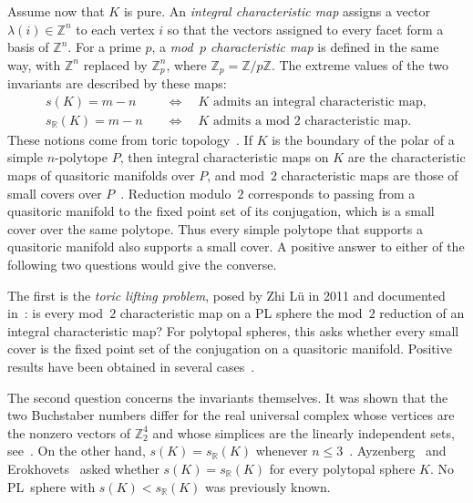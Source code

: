 \documentclass{amsart}
\theoremstyle{plain}
\numberwithin{equation}{section}
\theoremstyle{remark}
\theoremstyle{definition}
\newcommand{\Z}{\mathbb Z}
\newcommand{\R}{\mathbb R}
\begin{document}
Assume now that $K$ is pure.
An \emph{integral characteristic map} assigns a vector~$\lambda(i)\in\Z^n$ to each vertex $i$ so that the vectors assigned to every facet form a basis of $\Z^n$. 
For a prime $p$, a \emph{mod~$p$ characteristic map} is defined in the same way, with $\Z^n$ replaced by $\Z_p^n$, where $\Z_p=\Z/p\Z$.
The extreme values of the two invariants are described by these maps:
\begin{align*}
    s(K)=m-n &\quad\Longleftrightarrow\quad K\text{ admits an integral characteristic map},\\
    s_{\R}(K)=m-n &\quad\Longleftrightarrow\quad K\text{ admits a mod }2\text{ characteristic map}.  
\end{align*}
These notions come from toric topology~\cite{Davis-Januszkiewicz1991, Ishida-Fukukawa-Masuda2013, Buchstaber-Panov2015book}.
If $K$ is the boundary of the polar of a simple $n$-polytope $P$, then integral characteristic maps on $K$ are the characteristic maps of quasitoric manifolds over $P$, and mod~$2$ characteristic maps are those of small covers over $P$~\cite{Davis-Januszkiewicz1991}. 
Reduction modulo~$2$ corresponds to passing from a quasitoric manifold to the fixed point set of its conjugation, which is a small cover over the same polytope. 
Thus every simple polytope that supports a quasitoric manifold also supports a small cover. 
A positive answer to either of the following two questions would give the converse.

The first is the \emph{toric lifting problem}, posed by Zhi L\"u in 2011 and documented in~\cite{Choi-Park2016Wedge}: is every mod~$2$ characteristic map on a PL sphere the mod~$2$ reduction of an integral characteristic map? 
For polytopal spheres, this asks whether every small cover is the fixed point set of the conjugation on a quasitoric manifold. 
Positive results have been obtained in several cases~\cite{Choi-Jang-Vallee2025JLMS, Choi-Guan-Jang-Lu2026}. 

The second question concerns the invariants themselves. 
It was shown that the two Buchstaber numbers differ for the real universal complex whose vertices are the nonzero vectors of $\Z_2^4$ and whose simplices are the linearly independent sets, see~\cite{Ayzenberg2014preprint,Sun2017}. 
On the other hand, $s(K)=s_\R(K)$ whenever $n\le3$~\cite[Proposition~3.2.35]{Erokhovets2014}. 
Ayzenberg~\cite[Problem~1]{Ayzenberg2014preprint} and Erokhovets~\cite[Problem~3.2.39]{Erokhovets2014} asked whether $s(K)=s_\R(K)$ for every polytopal sphere $K$. 
No PL~sphere with $s(K) < s_\R(K)$ was previously known.
\end{document}
